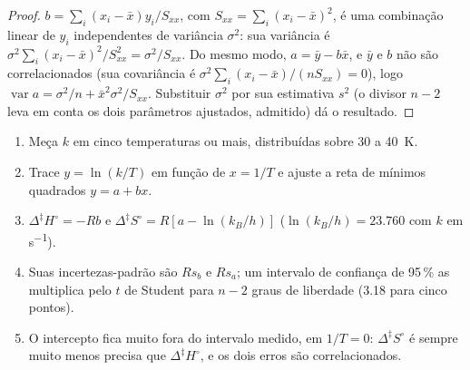 \begin{proof}
$b = \sum_i(x_i - \bar x)y_i/S_{xx}$, com $S_{xx} = \sum_i(x_i - \bar x)^2$, é uma combinação linear de
$y_i$ independentes de variância $\sigma^2$: sua variância é $\sigma^2\sum_i(x_i - \bar x)^2/S_{xx}^2 = \sigma^2/S_{xx}$.
Do mesmo modo, $a = \bar y - b\bar x$, e $\bar y$ e $b$ não são correlacionados (sua covariância é
$\sigma^2\sum_i(x_i - \bar x)/(nS_{xx}) = 0$), logo $\operatorname{var}a = \sigma^2/n + \bar x^2\sigma^2/S_{xx}$. Substituir $\sigma^2$
por sua estimativa $s^2$ (o divisor $n - 2$ leva em conta os dois parâmetros
ajustados, admitido) dá o resultado.
\end{proof}

\begin{method}\label{met:b3:rate-theories:eyring-plot}
\begin{enumerate}
  \item Meça $k$ em cinco temperaturas ou mais, distribuídas sobre 30 a \qty{40}{K}.
  \item Trace $y = \ln(k/T)$ em função de $x = 1/T$ e ajuste a reta de mínimos quadrados $y = a + bx$.
  \item $\Delta^{\ddagger}H^\circ = -Rb$ e $\Delta^{\ddagger}S^\circ = R[a - \ln(k_B/h)]$ ($\ln(k_B/h) = 23.760$ com $k$ em
        \unit{s^{-1}}).
  \item Suas incertezas-padrão são $Rs_b$ e $Rs_a$; um intervalo de confiança de 95\,\%
        as multiplica pelo $t$ de Student para $n - 2$ graus de liberdade (3.18 para
        cinco pontos).
  \item O intercepto fica muito fora do intervalo medido, em $1/T = 0$: $\Delta^{\ddagger}S^\circ$
        é sempre muito menos precisa que $\Delta^{\ddagger}H^\circ$, e os dois erros são
        correlacionados.
\end{enumerate}
\end{method}

